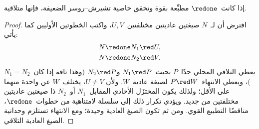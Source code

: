\documentclass[../../../include/open-logic-section]{subfiles}
\begin{document}
\begin{lem}
إذا كانت~$\redone$ مطبِّعة بقوة وتحقق خاصية تشيرش--روسر الضعيفة، فإنها
متلاقية.
\end{lem}

\begin{proof}
  افترض أن لـ~$N$ صيغتين عاديتين مختلفتين~$U,V$، واكتب الخطوتين الأوليين
  كما يأتي:
  \begin{align*}
    N &\redone N_1\red U,\\
    N &\redone N_2\red V.
  \end{align*}
  يعطي التلاقي المحلي حدًا~$P$ بحيث~$N_1\red P$ و$N_2\red P$ (وهذا تافه
  إذا كان~$N_1=N_2$)، ويعطي الانتهاء~$P\red W$ لصيغة عادية~$W$. ولأن
  $U\ne V$، يختلف~$W$ عن واحدة منهما على الأقل؛ ولذلك يكون المختزَل الأحادي
  المقابل~$N_1$ أو~$N_2$ ذا صيغتين عاديتين مختلفتين من جديد. ويؤدي تكرار
  ذلك إلى سلسلة لامتناهية من خطوات~$\redone$، مناقضًا التطبيع القوي. ومن ثم
  تكون الصيغ العادية وحيدة؛ ومع الانتهاء تستلزم وحدانية الصيغ العادية
  التلاقي.
\end{proof}
\end{document}
